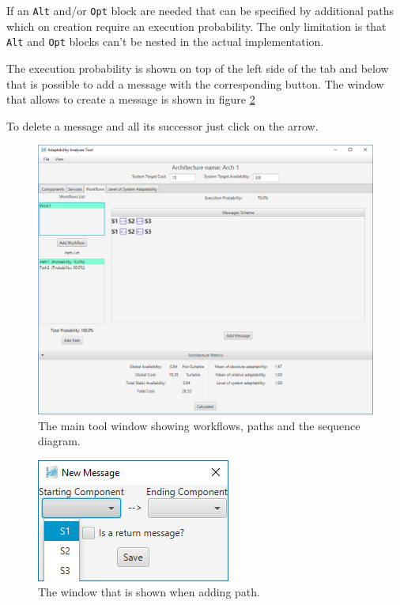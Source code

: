 If an \texttt{Alt} and/or \texttt{Opt} block are needed that can be specified by additional paths which on creation require an execution probability. The only limitation is that \texttt{Alt} and \texttt{Opt} blocks can't be nested in the actual implementation.

The execution probability is shown on top of the left side of the tab and below that is possible to add a message with the corresponding button. The window that allows to create a message is shown in figure \ref{fig:message}

To delete a message and all its successor just click on the arrow.

\begin{figure}[!ht]
	\centerline
	{\includegraphics[scale=0.50]{img/work1path1.png}}
	\caption[Workflows tab]{The main tool window showing workflows, paths and the sequence diagram.}
	\label{fig:workflow-path1}
\end{figure}

\begin{figure}[!ht]
	\centerline
	{\includegraphics[scale=0.6]{img/message.png}}
	\caption[Add path window]{The window that is shown when adding path.}
	\label{fig:message}
\end{figure}

